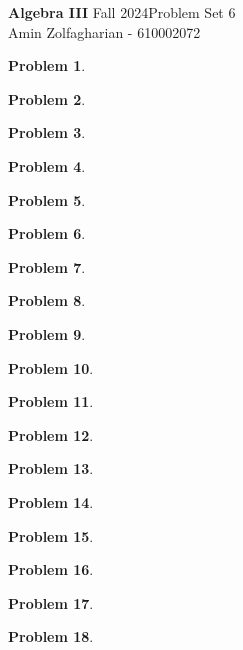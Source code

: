 \documentclass[12pt]{article}
\newcommand{\customanswer}[1]{%
\begin{problem}
\end{problem}

}
\newtheorem{problem}{Problem}
\begin{document}
\noindent \textbf{Algebra III} Fall 2024\hfill Problem Set 6\\
Amin Zolfagharian - 610002072

\hrulefill

\customanswer{8}
\customanswer{9}
\customanswer{1}
\customanswer{3}
\customanswer{4}
\newpage
\customanswer{5}
\customanswer{6}
\customanswer{10}
\customanswer{7}
\customanswer{11}
\customanswer{12}
\customanswer{13}
\newpage
\customanswer{14}
\customanswer{2}
\customanswer{15}
\customanswer{16}
\customanswer{17}
\customanswer{18}
\end{document}
